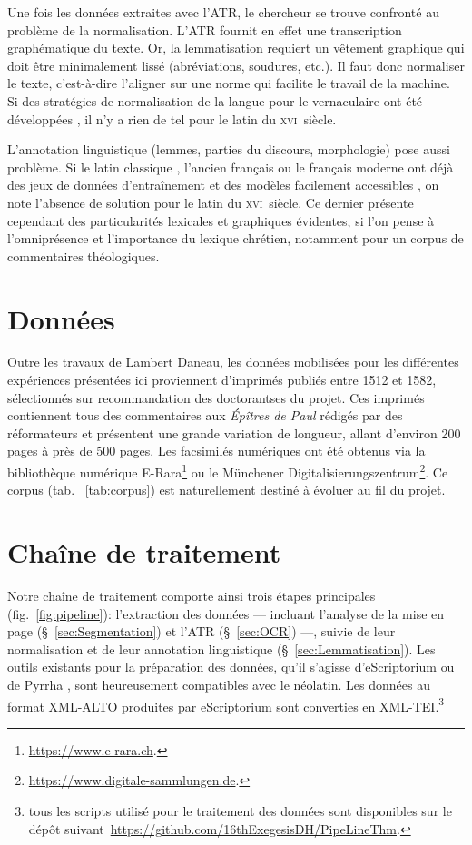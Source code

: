 \documentclass[final, fra]{anthology-ch}      %
\begin{document}
Une fois les données extraites avec l'ATR, le chercheur se trouve confronté au problème de la normalisation. L'ATR fournit en effet une transcription graphématique du texte. Or, la lemmatisation requiert un vêtement graphique qui doit être minimalement lissé (abréviations, soudures, etc.). Il faut donc normaliser le texte, c'est-à-dire l'aligner sur une norme qui facilite le travail de la machine. Si des stratégies de normalisation de la langue pour le vernaculaire ont été développées \cite{bawden:hal-03540226}, il n'y a rien de tel pour le latin du \textsc{xvi}\ieme{}~siècle. 

L'annotation linguistique (lemmes, parties du discours, morphologie) pose aussi problème. Si le latin classique \cite{cléri2022}, l'ancien français \cite{camps:halshs-03353125} ou le français moderne \cite{gabay:hal-03018381} ont déjà des jeux de données d'entraînement et des modèles facilement accessibles \cite{thibault_clerice_2020_3883590}, on note l'absence de solution pour le latin du \textsc{xvi}\ieme{}~siècle. Ce dernier présente cependant des particularités lexicales et graphiques évidentes, si l'on pense à l'omniprésence et l'importance du lexique chrétien, notamment pour un corpus de commentaires théologiques.

\section{Données}
\label{part:data}
Outre les travaux de Lambert Daneau, les données mobilisées pour les différentes expériences présentées ici proviennent d’imprimés publiés entre 1512 et 1582, sélectionnés sur recommandation des doctorants\textperiodcentered e\textperiodcentered s du projet. Ces imprimés contiennent tous des commentaires aux \textit{Épîtres de Paul} rédigés par des réformateurs et présentent une grande variation de longueur, allant d’environ 200 pages à près de 500 pages. Les facsimilés numériques ont été obtenus via la bibliothèque numérique E-Rara\footnote{\url{https://www.e-rara.ch}.} ou le Münchener Digitalisierungszentrum\footnote{\url{https://www.digitale-sammlungen.de}.}. Ce corpus (tab. ~\ref{tab:corpus}) est naturellement destiné à évoluer au fil du projet.

\section{Chaîne de traitement}

Notre chaîne de traitement comporte ainsi trois étapes principales (fig.~\ref{fig:pipeline}): l’extraction des données — incluant l'analyse de la mise en page (\S~\ref{sec:Segmentation}) et l'ATR (\S~\ref{sec:OCR}) —, suivie de leur normalisation et de leur annotation linguistique (\S~\ref{sec:Lemmatisation}). Les outils existants pour la préparation des données, qu’il s’agisse d'eScriptorium \cite{kiessling_escriptorium_2019} ou de Pyrrha \cite{clerice_building_2022}, sont heureusement compatibles avec le néolatin. Les données au format XML-ALTO produites par eScriptorium sont converties en XML-TEI.\footnote{tous les scripts utilisé pour le traitement des données sont disponibles sur le dépôt suivant~\url{https://github.com/16thExegesisDH/PipeLineThm}.}
\end{document}
